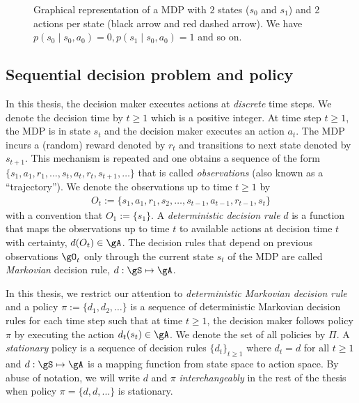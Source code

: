 \begin{figure}[ht]
    \centering
    \caption{Graphical representation of a MDP with $2$ states ($s_0$ and $s_1$) and 2 actions per state (black arrow and red dashed arrow). We have $p(s_0\mid s_0,a_0)=0, p(s_1\mid s_0,a_0)=1$ and so on.}
    \label{fig:MDP_example}
\end{figure}

\subsection{Sequential decision problem and policy}

In this thesis, the decision maker executes actions at \emph{discrete} time steps.
We denote the decision time by $t\ge1$ which is a positive integer.
At time step $t\ge1$, the MDP is in state $s_t$ and the decision maker executes an action $a_t$.
The MDP incurs a (random) reward denoted by $r_t$ and transitions to next state denoted by $s_{t+1}$.
This mechanism is repeated and one obtains a sequence of the form $\{s_1,a_1,r_1,\dots,s_t,a_t,r_t,s_{t+1},\dots\}$ that is called \emph{observations} (also known as a ``trajectory'').
We denote the observations up to time $t\ge1$ by
\begin{align*}
    O_t:=\{s_1,a_1,r_1,s_2,\dots,s_{t-1},a_{t-1},r_{t-1},s_t\}
\end{align*}
with a convention that $O_1:=\{s_1\}$.
A \emph{deterministic decision rule} $d$ is a function that maps the observations up to time $t$ to available actions at decision time $t$ with certainty, $d(O_t)\in\gA$.
The decision rules that depend on previous observations $\gO_t$ only through the current state $s_t$ of the MDP are called \emph{Markovian} decision rule, $d:\gS\mapsto\gA$.

In this thesis, we restrict our attention to \emph{deterministic Markovian decision rule} and a policy $\pi:=\{d_1,d_2,\dots\}$ is a sequence of deterministic Markovian decision rules for each time step such that at time $t\ge1$, the decision maker follows policy $\pi$ by executing the action $d_t(s_t)\in\gA$. 
We denote the set of all policies by $\Pi$.
A \emph{stationary} policy is a sequence of decision rules $\{d_t\}_{t\ge1}$ where $d_t=d$ for all $t\ge1$ and $d:\gS\mapsto\gA$ is a mapping function from state space to action space.
By abuse of notation, we will write $d$ and $\pi$ \emph{interchangeably} in the rest of the thesis when policy $\pi=\{d, d,...\}$ is stationary.

